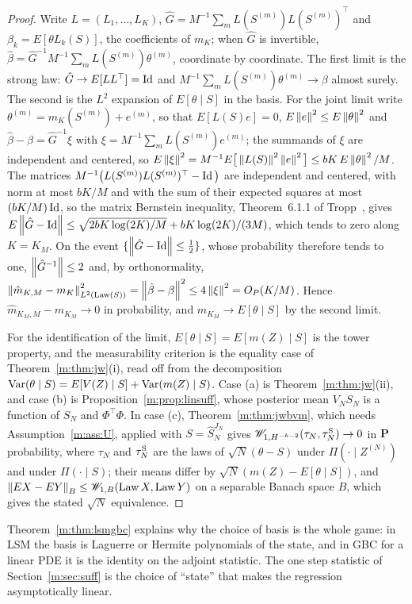 \begin{proof}
Write $L=(L_1,\dots,L_K)$, $\hat G=M^{-1}\sum_mL(S^{(m)})L(S^{(m)})^\top$ and $\beta_k=E[\theta L_k(S)]$, the coefficients of $m_K$; when $\hat G$ is invertible, $\hat\beta=\hat G^{-1}M^{-1}\sum_mL(S^{(m)})\theta^{(m)}$, coordinate by coordinate. The first limit is the strong law: $\hat G\to E[LL^\top]=\operatorname{Id}$ and $M^{-1}\sum_mL(S^{(m)})\theta^{(m)}\to\beta$ almost surely. The second is the $L^2$ expansion of $E[\theta\mid S]$ in the basis. For the joint limit write $\theta^{(m)}=m_K(S^{(m)})+e^{(m)}$, so that $E[L(S)e]=0$, $E\left\|e\right\|^2\le E\left\|\theta\right\|^2$ and $\hat\beta-\beta=\hat G^{-1}\xi$ with $\xi=M^{-1}\sum_mL(S^{(m)})e^{(m)}$; the summands of $\xi$ are independent and centered, so $E\left\|\xi\right\|^2=M^{-1}E\big[\left\|L(S)\right\|^2\left\|e\right\|^2\big]\le bK\,E\left\|\theta\right\|^2/M$. The matrices $M^{-1}\big(L(S^{(m)})L(S^{(m)})^\top-\operatorname{Id}\big)$ are independent and centered, with norm at most $bK/M$ and with the sum of their expected squares at most $(bK/M)\operatorname{Id}$, so the matrix Bernstein inequality, Theorem~6.1.1 of Tropp~\cite{tropp2015}, gives $E\left\|\hat G-\operatorname{Id}\right\|\le\sqrt{2bK\log(2K)/M}+bK\log(2K)/(3M)$, which tends to zero along $K=K_M$. On the event $\{\left\|\hat G-\operatorname{Id}\right\|\le\frac12\}$, whose probability therefore tends to one, $\left\|\hat G^{-1}\right\|\le2$ and, by orthonormality, $\left\|\hat m_{K,M}-m_K\right\|^2_{L^2(\operatorname{Law}(S))}=\left\|\hat\beta-\beta\right\|^2\le4\left\|\xi\right\|^2=O_P(K/M)$. Hence $\hat m_{K_M,M}-m_{K_M}\to0$ in probability, and $m_{K_M}\to E[\theta\mid S]$ by the second limit.

For the identification of the limit, $E[\theta\mid S]=E[m(Z)\mid S]$ is the tower property, and the measurability criterion is the equality case of Theorem~\ref{m:thm:jw}(i), read off from the decomposition $\mathrm{Var}(\theta\mid S)=E[V(Z)\mid S]+\mathrm{Var}(m(Z)\mid S)$. Case (a) is Theorem~\ref{m:thm:jw}(ii), and case (b) is Proposition~\ref{m:prop:linsuff}, whose posterior mean $V_NS_N$ is a function of $S_N$ and $\Phi^\top\Phi$. In case (c), Theorem~\ref{m:thm:jwbvm}, which needs Assumption~\ref{m:ass:U}, applied with $S=\hat S^{J_N}_N$ gives $\mathscr{W}_{1,H^{-k-2}}(\tau_N,\tau^{\rm S}_N)\to0$ in $\mathbf{P}$ probability, where $\tau_N$ and $\tau^{\rm S}_N$ are the laws of $\sqrt N(\theta-S)$ under $\Pi(\cdot\mid Z^{(N)})$ and under $\Pi(\cdot\mid S)$; their means differ by $\sqrt N(m(Z)-E[\theta\mid S])$, and $\left\|EX-EY\right\|_B\le\mathscr{W}_{1,B}(\operatorname{Law} X,\operatorname{Law} Y)$ on a separable Banach space $B$, which gives the stated $\sqrt N$ equivalence.
\end{proof}

Theorem~\ref{m:thm:lsmgbc} explains why the choice of basis is the whole game: in LSM the basis is Laguerre or Hermite polynomials of the state, and in GBC for a linear PDE it is the identity on the adjoint statistic. The one step statistic of Section~\ref{m:sec:suff} is the choice of ``state'' that makes the regression asymptotically linear.

